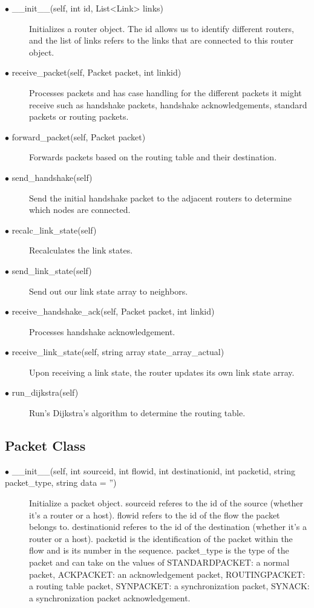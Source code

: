 \documentclass{article}
\begin{document}
\begin{description}
	\item [$\bullet$ \_\_init\_\_(self, int id, List<Link> links)] Initializes a router object. The id allows us to identify different routers, and the list of links refers to the links that are connected to this router object. 
	\item [$\bullet$ receive\_packet(self, Packet packet, int linkid)]  Processes packets and has case handling for the different packets it might receive such as handshake packets, handshake acknowledgements, standard packets or routing packets. 
	\item [$\bullet$ forward\_packet(self, Packet packet)] Forwards packets based on the routing table and their destination.
	\item [$\bullet$ send\_handshake(self)] Send the initial handshake packet to the adjacent routers to determine which nodes are connected.
	\item [$\bullet$ recalc\_link\_state(self)] Recalculates the link states.
	\item [$\bullet$ send\_link\_state(self)] Send out our link state array to neighbors.
	\item [$\bullet$ receive\_handshake\_ack(self, Packet packet, int linkid)] Processes handshake acknowledgement.
	\item [$\bullet$ receive\_link\_state(self, string array  state\_array\_actual)] Upon receiving a link state, the router updates its own link state array.
	\item [$\bullet$ run\_dijkstra(self)] Run's Dijkstra's algorithm to determine the routing table.
\end{description}

\subsection{Packet Class}

\begin{description}
	\item [$\bullet$ \_\_init\_\_(self, int sourceid, int flowid, int destinationid, int packetid, string packet\_type, string data = '')] Initialize a packet object. sourceid referes to the id of the source (whether it's a router or a host). flowid refers to the id of the flow the packet belongs to. destinationid referes to the id of the destination (whether it's a router or a host). packetid is the identification of the packet within the flow and is its number in the sequence. packet\_type is the type of the packet and can take on the values of STANDARDPACKET: a normal packet, ACKPACKET: an acknowledgement packet, ROUTINGPACKET: a routing table packet, SYNPACKET: a synchronization packet, SYNACK: a synchronization packet acknowledgement. 
\end{description}
\end{document}
